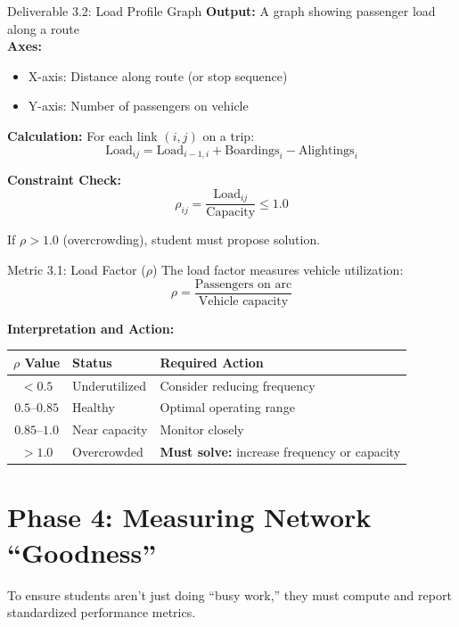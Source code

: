 \documentclass[11pt,letterpaper]{article}
\begin{document}
\begin{deliverablebox}{Deliverable 3.2: Load Profile Graph}
\textbf{Output:} A graph showing passenger load along a route\\[0.2cm]
\textbf{Axes:}
\begin{itemize}[nosep]
    \item X-axis: Distance along route (or stop sequence)
    \item Y-axis: Number of passengers on vehicle
\end{itemize}

\textbf{Calculation:}
For each link $(i, j)$ on a trip:
\[
\text{Load}_{ij} = \text{Load}_{i-1,i} + \text{Boardings}_i - \text{Alightings}_i
\]

\textbf{Constraint Check:}
\[
\rho_{ij} = \frac{\text{Load}_{ij}}{\text{Capacity}} \leq 1.0
\]

If $\rho > 1.0$ (overcrowding), student must propose solution.
\end{deliverablebox}

\begin{metricbox}{Metric 3.1: Load Factor ($\rho$)}
The load factor measures vehicle utilization:
\[
\rho = \frac{\text{Passengers on arc}}{\text{Vehicle capacity}}
\]

\textbf{Interpretation and Action:}
\begin{center}
\begin{tabular}{cll}
\toprule
\textbf{$\rho$ Value} & \textbf{Status} & \textbf{Required Action} \\
\midrule
$< 0.5$ & Underutilized & Consider reducing frequency \\
$0.5$--$0.85$ & Healthy & Optimal operating range \\
$0.85$--$1.0$ & Near capacity & Monitor closely \\
$> 1.0$ & Overcrowded & \textbf{Must solve:} increase frequency or capacity \\
\bottomrule
\end{tabular}
\end{center}
\end{metricbox}

\section{Phase 4: Measuring Network ``Goodness''}

To ensure students aren't just doing ``busy work,'' they must compute and report standardized performance metrics.
\end{document}
